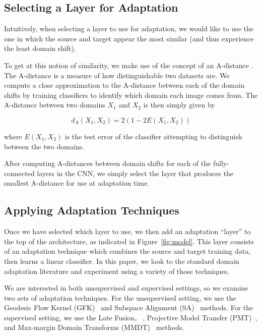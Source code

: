\subsection{Selecting a Layer for Adaptation}

Intuitively, when selecting a layer to use for adaptation, we would like to use
the one in which the source and target appear the most similar (and thus
experience the least domain shift).

To get at this notion of similarity, we make use of the concept of an A-distance
. The A-distance is a measure of how distinguishable
two datasets are. We compute a close approximation to the A-distance between
each of the domain shifts by training classifiers to identify which domain each
image comes from. The A-distance between two domains $X_1$ and $X_2$ is then
simply given by

\begin{equation}
  d_A(X_1, X_2) = 2 \left( 1 - 2E(X_1, X_2)\right)
\end{equation}


where $E(X_1, X_2)$ is the test error of the classifier attempting to
distinguish between the two domains.

After computing A-distances between domain shifts for each of the
fully-connected layers in the CNN, we simply select the layer that produces the
smallest A-distance for use at adaptation time.

\subsection{Applying Adaptation Techniques}

Once we have selected which layer to use, we then add an adaptation ``layer'' to
the top of the architecture, as indicated in Figure~\ref{fig:model}. This layer
consists of an adaptation technique which combines the source and target
training data, then learns a linear classifier. In this paper, we look to the
standard domain adaptation literature and experiment using a variety of those
techniques.

We are interested in both unsupervised and supervised settings, so we examine
two sets of adaptation techniques. For the unsupervised setting, we use the
Geodesic Flow Kernel (GFK)~\cite{gong-cvpr12} and Subspace Alignment
(SA)~\cite{sa} methods. For the supervised setting, we use the Late Fusion,
\daume~\cite{daume}, Projective Model Transfer (PMT)~\cite{aytar-iccv11}, and
Max-margin Domain Transforms (MMDT)~\cite{hoffman-iclr13} methods.
